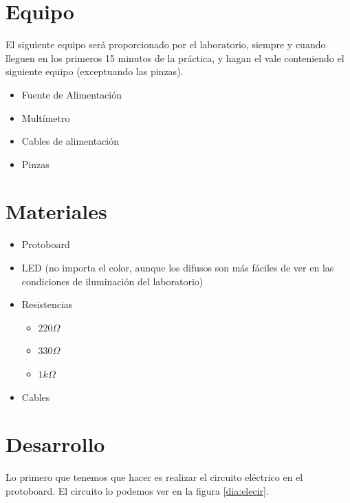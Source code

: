\section{Equipo}

	El siguiente equipo será proporcionado por el laboratorio, siempre y cuando lleguen en los primeros 15 minutos de la práctica, y hagan el vale conteniendo el siguiente equipo (exceptuando las pinzas).

	\begin{itemize}
		\item Fuente de Alimentación
		\item Multímetro
		\item Cables de alimentación
		\item Pinzas
	\end{itemize}


\section{Materiales}

	\begin{itemize}
		\item Protoboard
		\item LED (no importa el color, aunque los difusos son más fáciles de ver en las condiciones de iluminación del laboratorio)
		\item Resistencias
		\begin{itemize}
			\item $220 \Omega$
			\item $330 \Omega$
			\item $1 k\Omega$
		\end{itemize}
		\item Cables
	\end{itemize}


\section{Desarrollo}

    Lo primero que tenemos que hacer es realizar el circuito eléctrico en el protoboard. El circuito lo podemos ver en la figura \ref{dia:elecir}. \\

